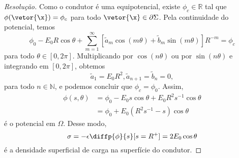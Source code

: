 \begin{proof}[Resolução]
    Como o condutor é uma equipotencial, existe \(\phi_c \in \mathbb{R}\) tal que \(\phi(\vetor{\x}) = \phi_c\) para todo \(\vetor{\x} \in \partial \Sigma\). Pela continuidade do potencial, temos
    \begin{equation*}
        \phi_0 - E_0R \cos\theta + \sum_{m = 1}^\infty \left[\tilde{a}_m \cos(m\theta) + \tilde{b}_m\sin(m\theta)\right]R^{-m} = \phi_c
    \end{equation*}
    para todo \(\theta \in [0,2\pi]\). Multiplicando por \(\cos(n\theta)\) ou por \(\sin(n\theta)\) e integrando em \([0,2\pi]\), obtemos
    \begin{equation*}
        \tilde{a}_1 = E_0R^2, \tilde{a}_{n+1}=\tilde{b}_n = 0,
    \end{equation*}
    para todo \(n \in \mathbb{N}\), e podemos concluir que \(\phi_c = \phi_0\). Assim,
    \begin{align*}
        \phi(s, \theta) &= \phi_0 - E_0s \cos\theta + E_0R^2s^{-1}\cos\theta\\
                        &= \phi_0 + E_0 \left(R^2s^{-1} - s\right)\cos\theta
    \end{align*}
    é o potencial em \(\Omega\). Desse modo,
    \begin{equation*}
        \sigma = -\epsilon \diffp{\phi}{s}[s=R^+] = 2E_0\cos\theta
    \end{equation*}
    é a densidade superficial de carga na superfície do condutor.
\end{proof}
